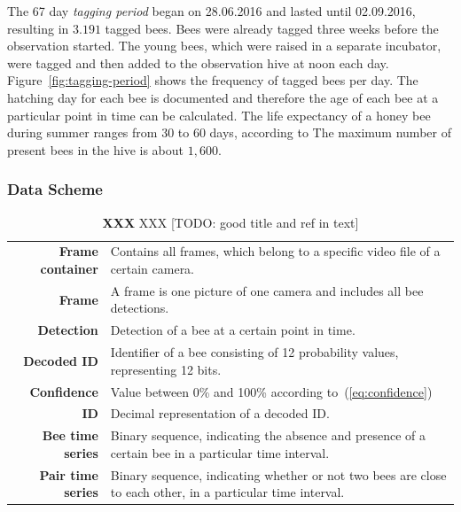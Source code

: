 The 67 day \emph{tagging period} began on 28.06.2016 and lasted until 02.09.2016, resulting in $3.191$ tagged bees.
Bees were already tagged three weeks before the observation started.
The young bees, which were raised in a separate incubator, were tagged and then added to the observation hive at noon each day.
Figure~\ref{fig:tagging-period} shows the frequency of tagged bees per day.
The hatching day for each bee is documented and therefore the age of each bee at a particular point in time can be calculated.
The life expectancy of a honey bee during summer ranges from 30 to 60 days, according to \textcite[p. 27]{menzel2016intelligenz}
The maximum number of present bees in the hive is about $1,600$.

\subsubsection{Data Scheme}
\label{subsec:datascheme}

\begin{table}[!t]
\small
\caption[X]{\textbf{XXX} XXX [TODO: good title and ref in text]}
\label{tab:dataset}
\colorbox{usethiscolorhere}{
\centering
\begin{tabularx}{\textwidth}{@{} r Y @{}}
	\textbf{Frame container} &
	Contains all frames, which belong to a specific video file of a certain camera.\\
	\textbf{Frame} &
	A frame is one picture of one camera and includes all bee detections.\\
	\textbf{Detection} &
	Detection of a bee at a certain point in time.\\
	\textbf{Decoded ID} &
	Identifier of a bee consisting of 12 probability values, representing 12 bits.\\
	\textbf{Confidence} &
	Value between 0\% and 100\% according to~(\ref{eq:confidence})\\
	\textbf{ID} &
	Decimal representation of a decoded ID.\\
	\textbf{Bee time series} & Binary sequence, indicating the absence and presence of a certain bee in a particular time interval.\\
	\textbf{Pair time series} & Binary sequence, indicating whether or not two bees are close to each other, in a particular time interval.\\
\end{tabularx}
}
\end{table}

